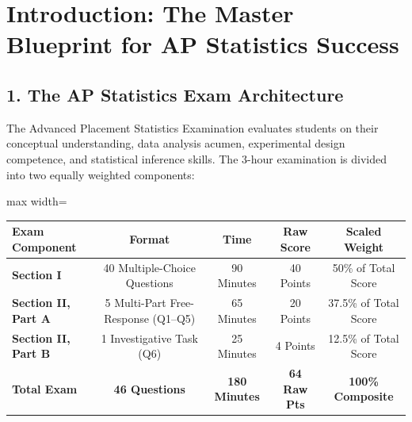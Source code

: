 \chapter*{Introduction: The Master Blueprint for AP Statistics Success}

\section*{1. The AP Statistics Exam Architecture}
The Advanced Placement Statistics Examination evaluates students on their conceptual understanding, data analysis acumen, experimental design competence, and statistical inference skills. The 3-hour examination is divided into two equally weighted components:

\begin{center}
\begin{adjustbox}{max width=\linewidth}
\begin{tabular}{lcccc}
\toprule
\textbf{Exam Component} & \textbf{Format} & \textbf{Time} & \textbf{Raw Score} & \textbf{Scaled Weight} \\
\midrule
\textbf{Section I} & 40 Multiple-Choice Questions & 90 Minutes & 40 Points & 50\% of Total Score \\
\textbf{Section II, Part A} & 5 Multi-Part Free-Response (Q1--Q5) & 65 Minutes & 20 Points & 37.5\% of Total Score \\
\textbf{Section II, Part B} & 1 Investigative Task (Q6) & 25 Minutes & 4 Points & 12.5\% of Total Score \\
\midrule
\textbf{Total Exam} & \textbf{46 Questions} & \textbf{180 Minutes} & \textbf{64 Raw Pts} & \textbf{100\% Composite} \\
\bottomrule
\end{tabular}
\end{adjustbox}
\end{center}

